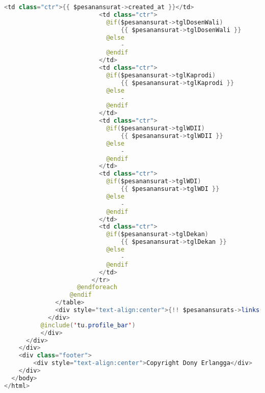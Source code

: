 \begin{lstlisting}[language=Java,basicstyle=\tiny,caption=Persetujuan surat]
                          <td class="ctr">{{ $pesanansurat->created_at }}</td>
                          <td class="ctr">
                            @if($pesanansurat->tglDosenWali)
                                {{ $pesanansurat->tglDosenWali }}
                            @else
                                -
                            @endif
                          </td>
                          <td class="ctr">
                            @if($pesanansurat->tglKaprodi)
                                {{ $pesanansurat->tglKaprodi }}
                            @else
                                -
                            @endif
                          </td>
                          <td class="ctr">
                            @if($pesanansurat->tglWDII)
                                {{ $pesanansurat->tglWDII }}
                            @else
                                -
                            @endif
                          </td>
                          <td class="ctr">
                            @if($pesanansurat->tglWDI)
                                {{ $pesanansurat->tglWDI }}
                            @else
                                -
                            @endif
                          </td>
                          <td class="ctr">
                            @if($pesanansurat->tglDekan)
                                {{ $pesanansurat->tglDekan }}
                            @else
                                -
                            @endif
                          </td>
                        </tr>
                    @endforeach
                  @endif
              </table>
              <div style="text-align:center">{!! $pesanansurats->links() !!}</div>
            </div>
          @include('tu.profile_bar')
          </div>
      </div>
    </div>
    <div class="footer">
        <div style="text-align:center">Copyright Dony Erlangga</div>
    </div>
  </body>
</html>

\end{lstlisting}

